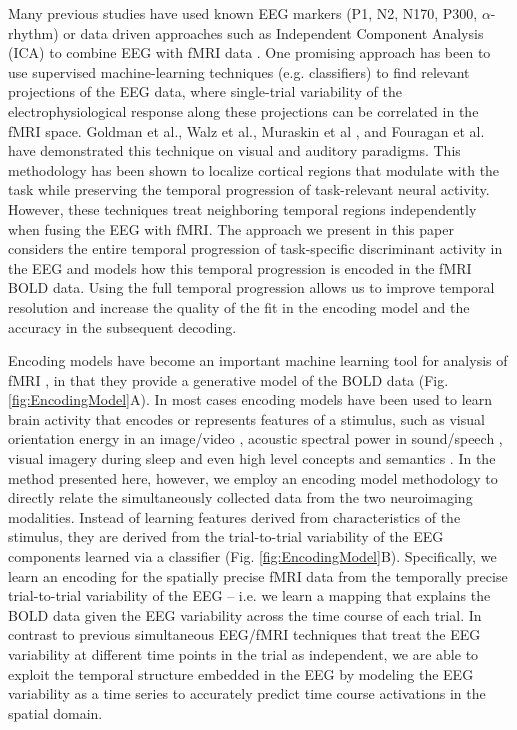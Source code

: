 Many previous studies have used known EEG markers (P1, N2, N170, P300, $\alpha$-rhythm) or data driven approaches such as Independent Component Analysis (ICA) to combine EEG with fMRI data \cite{Baumeister2014,DeMartino2010,Huster2012,Jann2009,Jaspers-Fayer2012,Mayhew2013,Nguyen2014,Novitskiy2011,Omata2013,Warbrick2009}. One promising approach has been to use supervised machine-learning techniques (e.g. classifiers) to find relevant projections of the EEG data, where single-trial variability of the electrophysiological response along these projections can be correlated in the fMRI space. Goldman et al.\cite{Goldman2009}, Walz et al.\cite{Walz2013}, Muraskin et al \cite{Muraskin2016}, and Fouragan et al.\cite{Fouragnan2015} have demonstrated this technique on visual and auditory paradigms. This methodology has been shown to localize cortical regions that modulate with the task while preserving the temporal progression of task-relevant neural activity. However, these techniques treat neighboring temporal regions independently when fusing the EEG with fMRI. The approach we present in this paper considers the entire temporal progression of task-specific discriminant activity in the EEG and models how this temporal progression is encoded in the fMRI BOLD data.  Using the full temporal progression allows us to improve temporal resolution and increase the quality of the fit in the encoding model and the accuracy in the subsequent decoding. 

Encoding models have become an important machine learning tool for analysis of fMRI \cite{Naselaris2011}, in that they provide a generative model of the BOLD data (Fig. \ref{fig:EncodingModel}A). In most cases encoding models have been used to learn brain activity that encodes or represents features of a stimulus, such as visual orientation energy in an image/video \cite{Hansen2007,Kay2008,Nishimoto2011}, acoustic spectral power in sound/speech \cite{Silbert2014}, visual imagery during sleep \cite{Horikawa2013} and even high level concepts and semantics \cite{Huth2016}. In the method presented here, however, we employ an encoding model methodology to directly relate the simultaneously collected data from the two neuroimaging modalities. Instead of learning features derived from characteristics of the stimulus, they are derived from the trial-to-trial variability of the EEG components learned via a classifier (Fig. \ref{fig:EncodingModel}B). Specifically, we learn an encoding for the spatially precise fMRI data from the temporally precise trial-to-trial variability of the EEG -- i.e. we learn a mapping that explains the BOLD data given the EEG variability across the time course of each trial. In contrast to previous simultaneous EEG/fMRI techniques that treat the EEG variability at different time points in the trial as independent, we are able to exploit the temporal structure embedded in the EEG by modeling the EEG variability as a time series to accurately predict time course activations in the spatial domain.  

